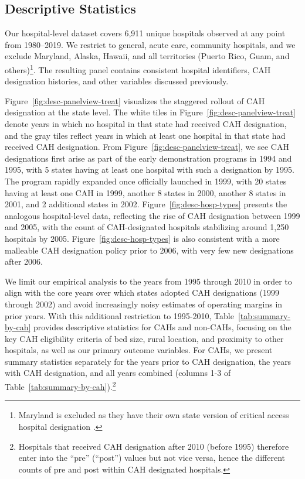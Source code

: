 \documentclass[a4paper, 12pt, twoside]{article}
\begin{document}
\subsection{Descriptive Statistics}
\label{sec:desc}

Our hospital-level dataset covers 6,911 unique hospitals observed at any point from 1980--2019. We restrict to general, acute care, community hospitals, and we exclude Maryland, Alaska, Hawaii, and all territories (Puerto Rico, Guam, and others)\footnote{Maryland is excluded as they have their own state version of critical access hospital designation \citep{mhcc2020}.}. The resulting panel contains consistent hospital identifiers, CAH designation histories, and other variables discussed previously.

Figure~\ref{fig:desc-panelview-treat} visualizes the staggered rollout of CAH designation at the state level. The white tiles in Figure~\ref{fig:desc-panelview-treat} denote years in which no hospital in that state had received CAH designation, and the gray tiles reflect years in which at least one hospital in that state had received CAH designation. From Figure~\ref{fig:desc-panelview-treat}, we see CAH designations first arise as part of the early demonstration programs in 1994 and 1995, with 5 states having at least one hospital with such a designation by 1995. The program rapidly expanded once officially launched in 1999, with 20 states having at least one CAH in 1999, another 8 states in 2000, another 8 states in 2001, and 2 additional states in 2002. Figure~\ref{fig:desc-hosp-types} presents the analogous hospital-level data, reflecting the rise of CAH designation between 1999 and 2005, with the count of CAH-designated hospitals stabilizing around 1,250 hospitals by 2005. Figure~\ref{fig:desc-hosp-types} is also consistent with a more malleable CAH designation policy prior to 2006, with very few new designations after 2006.

We limit our empirical analysis to the years from 1995 through 2010 in order to align with the core years over which states adopted CAH designations (1999 through 2002) and avoid increasingly noisy estimates of operating margins in prior years. With this additional restriction to 1995-2010, Table~\ref{tab:summary-by-cah} provides descriptive statistics for CAHs and non-CAHs, focusing on the key CAH eligibility criteria of bed size, rural location, and proximity to other hospitals, as well as our primary outcome variables. For CAHs, we present summary statistics separately for the years prior to CAH designation, the years with CAH designation, and all years combined (columns 1-3 of Table~\ref{tab:summary-by-cah}).\footnote{Hospitals that received CAH designation after 2010 (before 1995) therefore enter into the ``pre'' (``post'') values but not vice versa, hence the different counts of pre and post within CAH designated hospitals.} 
\end{document}
